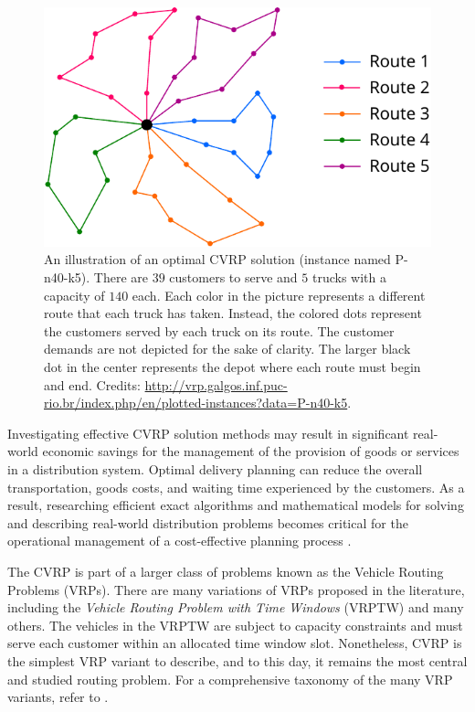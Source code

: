 \begin{figure}[t]
	\centering
	\includegraphics[width=12cm]{Imgs/P-n40-k5-solution.out.cropped.pdf}
	\caption{An illustration of an optimal CVRP solution (instance named P-n40-k5).
		There are $39$ customers to serve and $5$ trucks with a capacity of $140$ each.
		Each color in the picture represents a different route that each truck has taken.
		Instead, the colored dots represent the customers served by each truck on its route.
		The customer demands are not depicted for the sake of clarity.
		The larger black dot in the center represents the depot where each route must begin and end.
		Credits: \url{http://vrp.galgos.inf.puc-rio.br/index.php/en/plotted-instances?data=P-n40-k5}.
	}
	\label{fig:cvrp-optimal-solution-example}
\end{figure}

Investigating effective CVRP solution methods may result in
significant real-world economic savings for the management
of the provision of goods or services in a distribution system.
Optimal delivery planning can reduce the overall transportation, goods costs,
and waiting time experienced by the customers.
As a result, researching efficient exact algorithms and mathematical models
for solving and describing real-world distribution problems
becomes critical for the operational management
of a cost-effective planning process \parencite{toth2002,toth2014}.

The CVRP is part of a larger class of problems known as the Vehicle Routing Problems (VRPs).
There are many variations of VRPs proposed in the literature, including
the \textit{Vehicle Routing Problem with Time Windows} (VRPTW) \parencite{schrage1981}
and many others.
The vehicles in the VRPTW are subject to capacity constraints
and must serve each customer within an allocated time window slot.
Nonetheless, CVRP is the simplest VRP variant to describe,
and to this day, it remains the most central and studied routing problem.
For a comprehensive taxonomy of the many VRP variants, refer to \textcite{eksioglu2009, braekers2016}.

